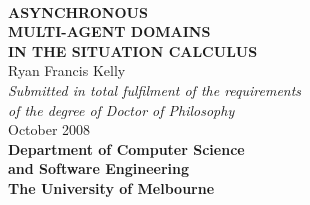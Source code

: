 %
%
%
%







\begin{titlepage}
\begin{center}
\ \\
\vspace{2cm}
{\bf\LARGE  ASYNCHRONOUS }\\ \vspace{0.5cm}
{\bf\LARGE  MULTI-AGENT DOMAINS }\\ \vspace{0.5cm}
{\bf\LARGE  IN THE SITUATION CALCULUS } \\
\vspace{3cm}
{\LARGE      Ryan Francis Kelly       }\\
\vspace{5cm}
{\em\large Submitted in total fulfilment of the requirements}\\ \vspace{0.1cm}
{\em\large        of the degree of Doctor of Philosophy     }\\
\vspace{0.5cm}
{\Large             October 2008        }\\
\vspace{2.5cm}
{\bf\large Department of Computer Science\\ and Software Engineering}\\ \vspace{0.5cm}
{\bf\Large        The University of Melbourne     }\\
\vspace{0.5cm}
\end{center}
\end{titlepage}

\cleardoublepage

